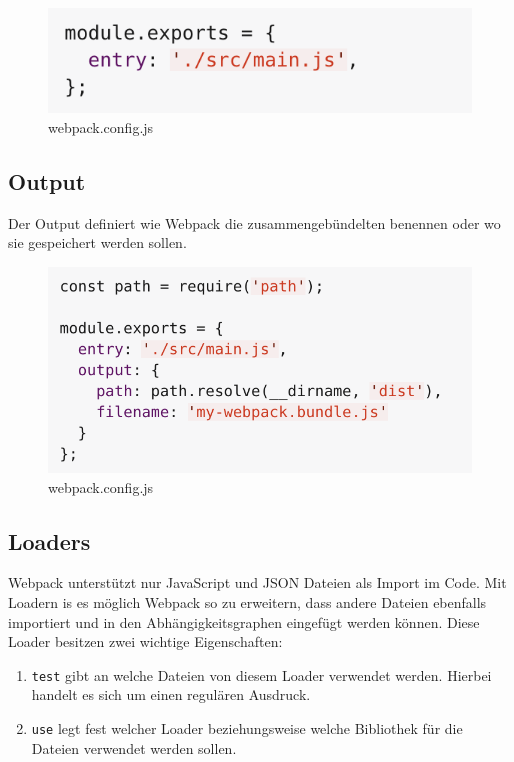 \begin{figure}[H]
	\begin{center}
		\includegraphics[scale=.7]{images/webpack-entry-point.png}
	\end{center}
		\caption{webpack.config.js}
\end{figure}

\subsection{Output}
Der Output definiert wie Webpack die zusammengebündelten benennen oder wo sie gespeichert werden sollen. 

\begin{figure}[H]
	\begin{center}
		\includegraphics[scale=.7]{images/webpack-output.png}
	\end{center}
		\caption{webpack.config.js}
\end{figure}

\subsection{Loaders}
Webpack unterstützt nur JavaScript und JSON Dateien als Import im Code. Mit Loadern is es möglich Webpack so zu erweitern, dass andere Dateien ebenfalls importiert und in den Abhängigkeitsgraphen eingefügt werden können. Diese Loader besitzen zwei wichtige Eigenschaften:

\begin{enumerate}
	\item \texttt{test} gibt an welche Dateien von diesem Loader verwendet werden. Hierbei handelt es sich um einen 
		regulären Ausdruck.
	\item \texttt{use} legt fest welcher Loader beziehungsweise welche Bibliothek für die Dateien verwendet werden sollen.
\end{enumerate}

